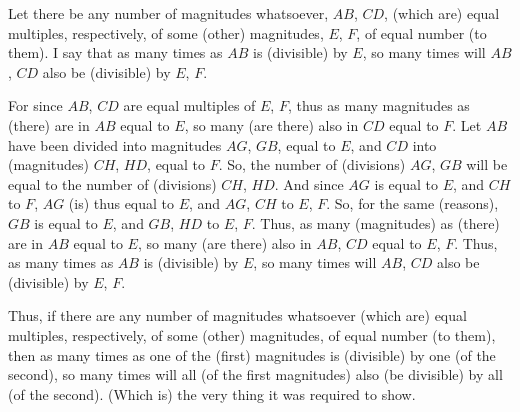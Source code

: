 \begin{Parallel}{}{}
{\epsfysize=0.6in
\centerline{}

Let there be any number of magnitudes whatsoever, $AB$, $CD$, (which are) equal multiples,
respectively, of some (other) magnitudes, $E$, $F$,  of equal  number
(to them). I say that as many times as $AB$ is (divisible) by $E$, so many times will
$AB$, $CD$ also be (divisible) by $E$, $F$.

For since $AB$, $CD$ are equal multiples of $E$, $F$, thus as many
magnitudes as (there) are in  $AB$ equal to $E$, so many (are there) also in $CD$ equal to $F$. Let $AB$ have been divided into magnitudes $AG$, $GB$, equal to $E$,
and $CD$ into (magnitudes) $CH$, $HD$, equal to $F$. So, the number of (divisions)
$AG$, $GB$ will be equal to the number of (divisions) $CH$, $HD$. And since
$AG$ is equal to $E$, and $CH$ to $F$,   $AG$ (is)  thus equal to $E$, and $AG$, $CH$ to
$E$, $F$. So, for the same (reasons), $GB$ is equal to $E$, and $GB$, $HD$ to $E$, $F$.
Thus, as many (magnitudes) as (there) are in $AB$ equal to $E$, so many (are there)
also in $AB$, $CD$ equal to $E$, $F$. Thus, as many times as $AB$ is (divisible) by $E$, so many
times will $AB$, $CD$ also be (divisible)  by $E$, $F$.

Thus, if there are any number of magnitudes whatsoever (which are) equal multiples, respectively, of
some (other) magnitudes,  of  equal  number (to them), then as many times as one of the (first) magnitudes is (divisible) by one (of the second), so many times
will all (of the first magnitudes) also (be divisible) by all (of the second). (Which is)
the very thing it was required to show.}
\end{Parallel}


\vspace{7pt}{\footnotesize \noindent$^\dag$ In modern notation, this proposition
reads $m\,\alpha + m\,\beta +\cdots= m\,(\alpha+\beta+\cdots)$.}


